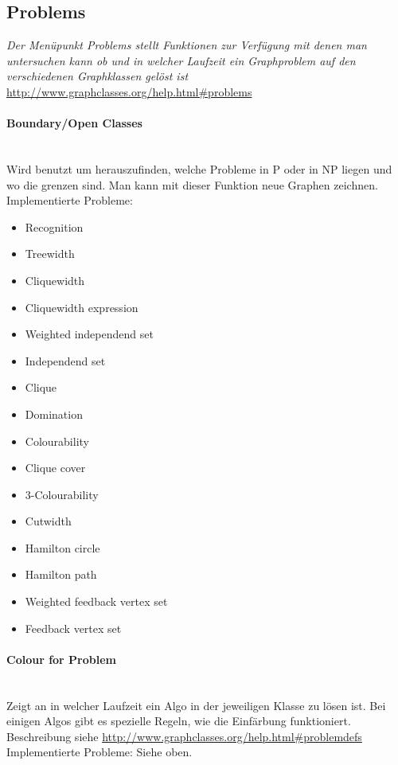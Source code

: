 \documentclass[10pt,a4paper]{article}
\begin{document}
\subsection{Problems}
\emph{Der Menüpunkt Problems stellt Funktionen zur Verfügung mit denen man untersuchen kann ob und in welcher Laufzeit ein Graphproblem auf den verschiedenen Graphklassen gelöst ist} \\
\href{http://www.graphclasses.org/help.html\#problems}{http://www.graphclasses.org/help.html\#problems}
\paragraph{Boundary/Open Classes} \ \\
Wird benutzt um herauszufinden, welche Probleme in P oder in NP liegen und wo die grenzen sind. Man kann mit dieser Funktion neue Graphen zeichnen.
Implementierte Probleme:
\begin{itemize}
\item Recognition
\item Treewidth
\item Cliquewidth
\item Cliquewidth expression
\item Weighted independend set
\item Independend set
\item Clique
\item Domination
\item Colourability
\item Clique cover
\item 3-Colourability
\item Cutwidth
\item Hamilton circle
\item Hamilton path
\item Weighted feedback vertex set
\item Feedback vertex set
\end{itemize}
\paragraph{Colour for Problem} \ \\
Zeigt an in welcher Laufzeit ein Algo in der jeweiligen Klasse zu lösen ist.  Bei einigen Algos gibt es spezielle Regeln, wie die Einfärbung funktioniert. Beschreibung siehe \href{http://www.graphclasses.org/help.html\#problemdefs}{http://www.graphclasses.org/help.html\#problemdefs} \\
Implementierte Probleme:
Siehe oben.
\end{document}
